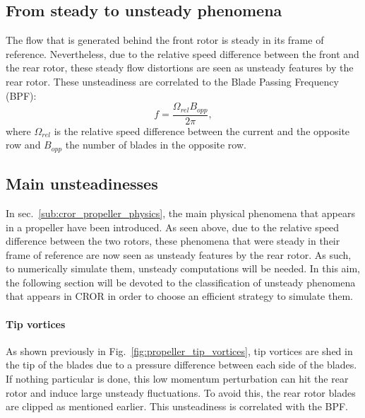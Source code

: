 
\subsection{From steady to unsteady phenomena}
\label{sub:cror_from_steady_to_unsteady_phenomena}

The flow that is generated behind the front rotor
is steady in its frame of reference. Nevertheless,
due to the relative speed difference between the
front and the rear rotor, these steady flow distortions are
seen as unsteady features by the rear rotor. 
These unsteadiness are correlated to the Blade Passing Frequency (BPF):
\begin{equation}
	f = \frac{\Omega_{rel} B_{opp}}{2 \pi},
\end{equation}
where $\Omega_{rel}$ is the relative speed difference between
the current and the opposite row
and $B_{opp}$ the number of blades in the opposite row.

\subsection{Main unsteadinesses}
\label{sub:cror_main_unsteadinesses}

In sec.~\ref{sub:cror_propeller_physics}, the main physical phenomena
that appears in a propeller have been introduced. As seen above, due to
the relative speed difference between the two rotors, these phenomena
that were steady in their frame of reference are now seen as unsteady features
by the rear rotor. As such, to numerically simulate them, unsteady computations
will be needed. In this aim, the following section will be devoted to the classification
of unsteady phenomena that appears in CROR in 
order to choose an efficient strategy to simulate them.

\paragraph{Tip vortices}

As shown previously in Fig.~\ref{fig:propeller_tip_vortices}, tip vortices are shed in the
tip of the blades due to a pressure difference between each side of the blades.
If nothing particular is done, this low momentum perturbation can
hit the rear rotor and induce large unsteady fluctuations. To avoid this,
the rear rotor blades are clipped as mentioned earlier. 
This unsteadiness is correlated with the BPF.

